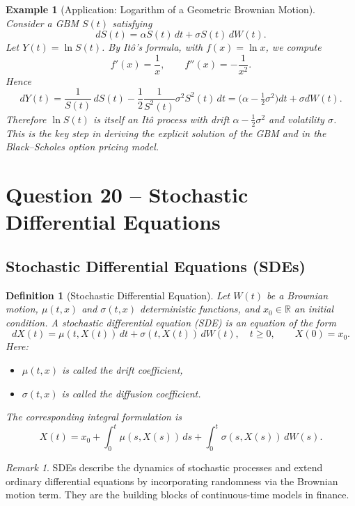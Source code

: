 \documentclass[12pt,a4paper]{book}
\newtheorem{definition}{Definition}[chapter]
\newtheorem{example}{Example}[chapter]
\theoremstyle{remark}
\newtheorem{remark}{Remark}[chapter]
\begin{document}
\begin{example}[Application: Logarithm of a Geometric Brownian Motion]
Consider a GBM $S(t)$ satisfying
\[
dS(t) = \alpha S(t)\,dt + \sigma S(t)\,dW(t).
\]
Let $Y(t) = \ln S(t)$. By Itô's formula, with $f(x) = \ln x$, we compute
\[
f'(x) = \frac{1}{x}, \qquad f''(x) = -\frac{1}{x^2}.
\]
Hence
\[
dY(t) = \frac{1}{S(t)}\,dS(t) - \frac{1}{2}\frac{1}{S^2(t)}\sigma^2 S^2(t)\,dt
= \Big(\alpha - \tfrac{1}{2}\sigma^2\Big)dt + \sigma dW(t).
\]
Therefore $\ln S(t)$ is itself an Itô process with drift $\alpha - \tfrac{1}{2}\sigma^2$ and volatility $\sigma$. This is the key step in deriving the explicit solution of the GBM and in the Black--Scholes option pricing model.
\end{example}










\newpage
\section{Question 20 -- Stochastic Differential Equations}
\subsection*{Stochastic Differential Equations (SDEs)}

\begin{definition}[Stochastic Differential Equation]
Let $W(t)$ be a Brownian motion, $\mu(t,x)$ and $\sigma(t,x)$ deterministic functions, and $x_0 \in \mathbb{R}$ an initial condition. 
A \emph{stochastic differential equation (SDE)} is an equation of the form
\[
dX(t) = \mu(t,X(t))\,dt + \sigma(t,X(t))\,dW(t), 
\quad t \geq 0, \qquad X(0) = x_0.
\]
Here:
\begin{itemize}
    \item $\mu(t,x)$ is called the \emph{drift coefficient},
    \item $\sigma(t,x)$ is called the \emph{diffusion coefficient}.
\end{itemize}
The corresponding \emph{integral formulation} is
\[
X(t) = x_0 + \int_0^t \mu(s,X(s))\,ds + \int_0^t \sigma(s,X(s))\,dW(s).
\]
\end{definition}

\begin{remark}
SDEs describe the dynamics of stochastic processes and extend ordinary differential equations by incorporating randomness via the Brownian motion term.
They are the building blocks of continuous-time models in finance.
\end{remark}
\end{document}
